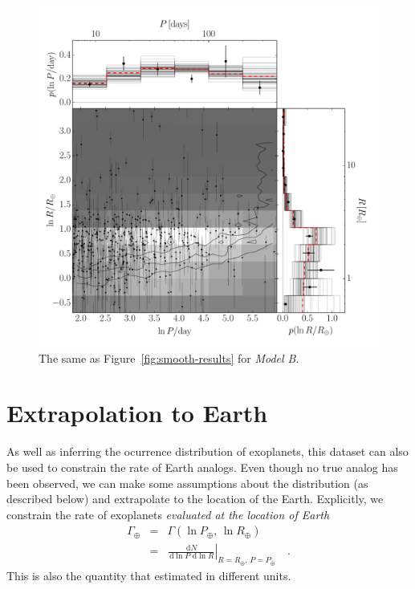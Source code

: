 \documentclass[12pt,preprint]{aastex}
\newcommand{\Fig}[1]{Figure~\ref{fig:#1}}
\newcommand{\fig}[1]{\Fig{#1}}
\newcommand{\figlabel}[1]{\label{fig:#1}}
\newcommand{\dd}{\ensuremath{\,\mathrm{d}}}
\newcommand{\rate}{\ensuremath{\Gamma}}
\newcommand{\radius}{\ensuremath{R}}
\newcommand{\period}{\ensuremath{P}}
\newcommand{\modelb}{\emph{Model B}}
\newcommand{\gammaearth}{{\ensuremath{\rate_\oplus}}}
\begin{document}
\begin{figure}[p]
\begin{center}
\includegraphics[width=\textwidth]{figures/simulation/results.pdf}
\end{center}
\caption{%
The same as \fig{smooth-results} for \modelb.
\figlabel{simulation-results}}
\end{figure}

\section{Extrapolation to Earth}

As well as inferring the ocurrence distribution of exoplanets, this dataset
can also be used to constrain the rate of Earth analogs.
Even though no true analog has been observed, we can make some assumptions
about the distribution (as described below) and extrapolate to the location of
the Earth.
Explicitly, we constrain the rate of exoplanets \emph{evaluated at the
location of Earth}
\begin{eqnarray}
\gammaearth &=& \rate (\ln\period_\oplus,\,\ln\radius_\oplus) \\
&=&
\left.\frac{\dd N}{\dd\ln\period\,\dd\ln\radius}\right|
_{\radius=\radius_\oplus,\,\period=\period_\oplus}\quad.
\end{eqnarray}
This is also the quantity that \citet{petigura} estimated in different units.
\end{document}
